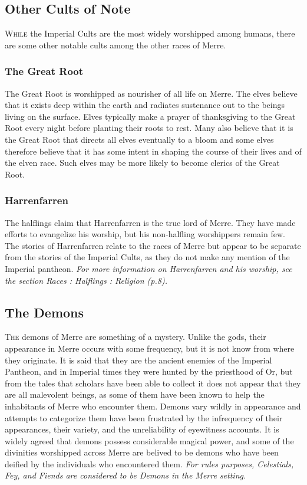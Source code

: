 \documentclass[paper=a4, fontsize=11pt]{scrartcl} %
\begin{document}
\begin{multicols}{2}
\subsection{Other Cults of Note}

\lettrine[lines=2]{\medievalsharp W}{hile} the Imperial Cults are the most widely worshipped among humans, there are some other notable cults among the other races of Merre.

\subsubsection{The Great Root}

The Great Root is worshipped as nourisher of all life on Merre. The elves believe that it exists deep within the earth and radiates sustenance out to the beings living on the surface. Elves typically make a prayer of thanksgiving to the Great Root every night before planting their roots to rest. Many also believe that it is the Great Root that directs all elves eventually to a bloom and some elves therefore believe that it has some intent in shaping the course of their lives and of the elven race. Such elves may be more likely to become clerics of the Great Root.

\subsubsection{Harrenfarren}

The halflings claim that Harrenfarren is the true lord of Merre. They have made efforts to evangelize his worship, but his non-halfling worshippers remain few. The stories of Harrenfarren relate to the races of Merre but appear to be separate from the stories of the Imperial Cults, as they do not make any mention of the Imperial pantheon. \textit{For more information on Harrenfarren and his worship, see the section Races : Halflings : Religion (p.8).}

\subsection{The Demons}

\lettrine[lines=2]{\medievalsharp T}{he} demons of Merre are something of a mystery. Unlike the gods, their appearance in Merre occurs with some frequency, but it is not know from where they originate. It is said that they are the ancient enemies of the Imperial Pantheon, and in Imperial times they were hunted by the priesthood of Or, but from the tales that scholars have been able to collect it does not appear that they are all malevolent beings, as some of them have been known to help the inhabitants of Merre who encounter them. Demons vary wildly in appearance and attempts to categorize them have been frustrated by the infrequency of their appearances, their variety, and the unreliability of eyewitness accounts. It is widely agreed that demons possess considerable magical power, and some of the divinities worshipped across Merre are belived to be demons who have been deified by the individuals who encountered them. \textit{For rules purposes, Celestials, Fey, and Fiends are considered to be Demons in the Merre setting.}


\end{multicols}
\end{document}
